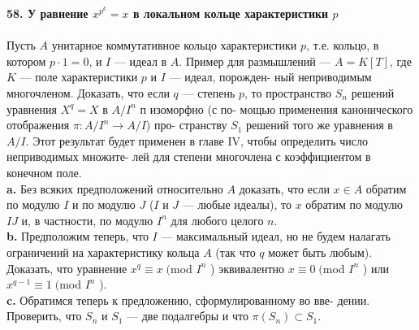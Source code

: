 \documentclass{mai_book}
\begin{document}
\noindent\textbf{58. У равнение $x^{p^k}=x$ в локальном кольце характеристики $p$}\\\\
\hspace*{10pt} Пусть $A$ унитарное коммутативное кольцо характеристики $p$, т.е.\linebreak
кольцо, в котором $p\cdot1=0$, и $I$ — идеал в $A$. Пример для размышлений\linebreak
— $A = K[T]$, где $K$ — поле характеристики $p$ и $I$ — идеал, порожден-\linebreak
ный неприводимым многочленом. Доказать, что если $q$ — степень $p$, то\linebreak
пространство $S_n$ решений уравнения $X^q= X$ в $A/I^n$ п изоморфно (с по-\linebreak
мощью применения канонического отображения $\pi:A/I^n\rightarrow A/I$) про-\linebreak
странству $S_1$ решений того же уравнения в $A/I$. Этот результат будет\linebreak
применен в главе IV, чтобы определить число неприводимых множите-\linebreak
лей для степени многочлена с коэффициентом в конечном поле.
\\
\hspace*{10pt}\textbf{a.} Без всяких предположений относительно $A$ доказать, что если\linebreak
$x\in A$ обратим по модулю $I$ и по модулю $J$ ($I$ и $J$ — любые идеалы),\linebreak
то $x$ обратим по модулю $IJ$ и, в частности, по модулю $I^n$ для любого\linebreak
целого $n$.
\\
\hspace*{10pt}\textbf{b.} Предположим теперь, что $I$ — максимальный идеал, но не будем\linebreak
налагать ограничений на характеристику кольца $A$ (так что $q$ может\linebreak
быть любым). Доказать, что уравнение $x^q\equiv x\; ($mod $I^n$ ) эквивалентно\linebreak
$x\equiv0\;($mod $I^n$ ) или $x^{q-1}\equiv1\;($mod $I^n$ ).
\\
\hspace*{10pt}\textbf{c.} Обратимся теперь к предложению, сформулированному во вве-\linebreak
дении. Проверить, что $S_n$ и $S_1$ — две подалгебры и что $\pi(S_n)\subset S_1$.\linebreak
\end{document}
